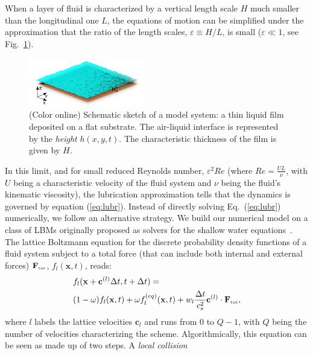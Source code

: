 When a layer of fluid is characterized by a vertical length scale $H$ much
smaller than the longitudinal one $L$, the equations of motion can be
simplified under the approximation that the ratio of the length scales, 
$\varepsilon \equiv H/L$, is small ($\varepsilon \ll1$, see Fig.~\ref{fig:scheme}).
\begin{figure}
    \centering
    \includegraphics[width = 0.45\textwidth]{graphics/Fig_1_Scheme_V3_filters_2.png}
    \caption{(Color online) Schematic sketch of a model system: a thin liquid film deposited on a flat substrate. The air-liquid interface is represented by the {\it height} $h(x,y,t)$. The characteristic thickness of the film is given by $H$.}
    \label{fig:scheme}
\end{figure}
In this limit, and for small reduced Reynolds number, $\varepsilon^2Re$
(where $Re=\frac{U L}{\nu}$, with $U$ being a characteristic velocity of the fluid system and $\nu$ being the fluid's kinematic viscosity),
the lubrication approximation tells that the dynamics is governed by equation (\ref{eq:lubr}).
Instead of directly solving Eq.~(\ref{eq:lubr}) numerically, we follow an alternative strategy.
We build our numerical model on a class of LBMs originally proposed as solvers for
the shallow water
equations~\cite{Salmon:1999:0022-2402:503,PhysRevE.65.036309,zhou2004lattice,van2010study}.
The lattice Boltzmann equation for the discrete probability density functions of a fluid system
subject to a total force (that can include both internal and external forces)
$\mathbf{F}_{\mbox{\tiny{tot}}}$,
$f_l(\mathbf{x},t)$, reads:
\begin{equation}\label{eq:LBE}
\begin{split}
&f_l(\mathbf{x}+\mathbf{c}^{(l)}\Delta t,t+\Delta t) = \\
&(1 - \omega) f_l(\mathbf{x},t) + \omega f_l^{(eq)}(\mathbf{x},t) + w_l \frac{\Delta t}{c_s^2} \mathbf{c}^{(l)} \cdot \mathbf{F}_{\mbox{\tiny{tot}}},
\end{split}
\end{equation}
where $l$ labels the lattice velocities $\mathbf{c}_l$ and runs from $0$ to $Q-1$, with $Q$ being the number
of velocities characterizing the scheme.
Algorithmically, this equation can be seen as made up of two steps. A {\it local collision}

